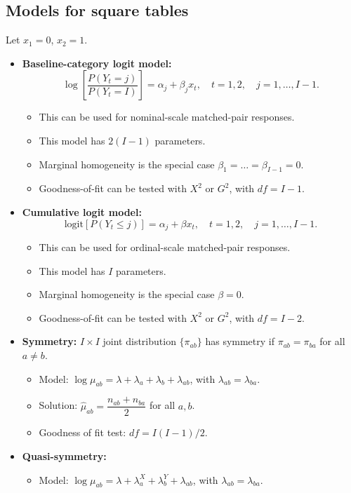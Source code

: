 \documentclass[twoside]{article}
\newcommand\lmb{\lambda}
\begin{document}
\subsection*{Models for square tables}
Let $x_1 = 0$, $x_2 = 1$.
\begin{itemize}
\item \textbf{Baseline-category logit model:} \[ \log \left[\frac{P(Y_t = j)}{P(Y_t = I)} \right] = \alpha_j + \beta_j x_t, \quad t = 1, 2, \quad j = 1, \dots, I-1. \]
\begin{itemize}
\item This can be used for nominal-scale matched-pair responses.
\item This model has $2(I-1)$ parameters.
\item Marginal homogeneity is the special case $\beta_1 = \dots = \beta_{I-1} = 0$.
\item Goodness-of-fit can be tested with $X^2$ or $G^2$, with $df = I - 1$.
\end{itemize}

\item \textbf{Cumulative logit model:} \[ \text{logit} \left[P(Y_t \leq j) \right] = \alpha_j + \beta x_t, \quad t = 1, 2, \quad j = 1, \dots, I-1. \]
\begin{itemize}
\item This can be used for ordinal-scale matched-pair responses.
\item This model has $I$ parameters.
\item Marginal homogeneity is the special case $\beta = 0$.
\item Goodness-of-fit can be tested with $X^2$ or $G^2$, with $df = I - 2$.
\end{itemize}

\item \textbf{Symmetry:} $I \times I$ joint distribution $\{ \pi_{ab}\}$ has symmetry if $\pi_{ab} = \pi_{ba}$ for all $a \neq b$.
\begin{itemize}
\item Model: $\log \mu_{ab} = \lmb + \lmb_a + \lmb_b + \lmb_{ab}$, with $\lmb_{ab} = \lmb_{ba}$.

\item Solution: $\hat{\mu}_{ab} = \dfrac{n_{ab} + n_{ba}}{2}$ for all $a,b$.

\item Goodness of fit test: $df = I(I-1)/2$.
\end{itemize}

\item \textbf{Quasi-symmetry:} 
\begin{itemize}
\item Model: $\log \mu_{ab} = \lmb + \lmb_a^X + \lmb_b^Y + \lmb_{ab}$, with $\lmb_{ab} = \lmb_{ba}$.


\end{itemize}
\end{itemize}
\end{document}
